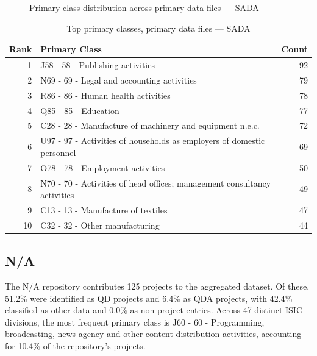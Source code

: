 \clearpage

\begin{figure}[H]
    \centering
    
    \caption{Primary class distribution across primary data files --- SADA}
\end{figure}

\begin{table}[H]
    \centering
    \begin{tabular}{r p{10cm} r}
    \hline
    \textbf{Rank} & \textbf{Primary Class} & \textbf{Count} \\
    \hline
    1 & J58 - 58 - Publishing activities & 92 \\
    2 & N69 - 69 - Legal and accounting activities & 79 \\
    3 & R86 - 86 - Human health activities & 78 \\
    4 & Q85 - 85 - Education & 77 \\
    5 & C28 - 28 - Manufacture of machinery and equipment n.e.c. & 72 \\
    6 & U97 - 97 - Activities of households as employers of domestic personnel & 69 \\
    7 & O78 - 78 - Employment activities & 50 \\
    8 & N70 - 70 - Activities of head offices; management consultancy activities & 49 \\
    9 & C13 - 13 - Manufacture of textiles & 47 \\
    10 & C32 - 32 - Other manufacturing & 44 \\
    \hline
    \end{tabular}
    \caption{Top primary classes, primary data files --- SADA}
\end{table}

\clearpage

\subsection{N/A}


The N/A repository contributes 125 projects to the aggregated dataset. Of these, 51.2\% were identified as QD projects and 6.4\% as QDA projects, with 42.4\% classified as other data and 0.0\% as non-project entries. Across 47 distinct ISIC divisions, the most frequent primary class is J60 - 60 - Programming, broadcasting, news agency and other content distribution activities, accounting for 10.4\% of the repository's projects.


